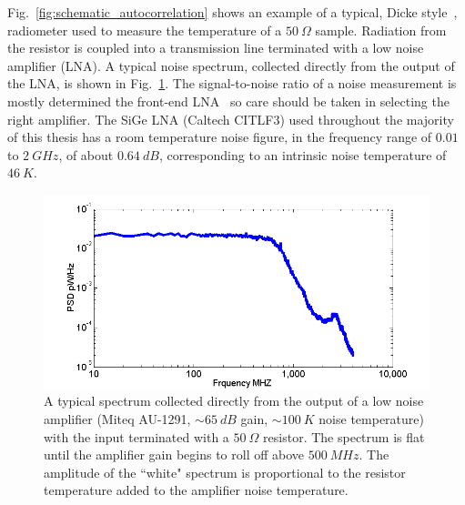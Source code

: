 Fig.~\ref{fig:schematic_autocorrelation} shows an example of a typical, Dicke style~\cite{dicke_measurement_1946}, radiometer used to measure the temperature of a $50~\Omega$ sample. Radiation from the resistor is coupled into a transmission line terminated with a low noise amplifier (LNA). A typical noise spectrum, collected directly from the output of the LNA, is shown in Fig.~\ref{fig:Miteq_spec}. The signal-to-noise ratio of a noise measurement is mostly determined the front-end LNA~\cite{pozar_microwave_2011} so care should be taken in selecting the right amplifier. The SiGe LNA (Caltech CITLF3) used throughout the majority of this thesis has a room temperature noise figure, in the frequency range of $0.01$ to $2~GHz$, of about $0.64~dB$, corresponding to an intrinsic noise temperature of $46~K$.
\begin{figure}
\includegraphics[width=\textwidth]{figures/Johnson_noise_thermometry/Miteq_spec.png}
\caption{A typical spectrum collected directly from the output of a low noise amplifier (Miteq AU-1291, ${\sim}65~dB$ gain, ${\sim}100~K$ noise temperature) with the input terminated with a $50~\Omega$ resistor. The spectrum is flat until the amplifier gain begins to roll off above $500~MHz$. The amplitude of the ``white" spectrum is proportional to the resistor temperature added to the amplifier noise temperature.}
\label{fig:Miteq_spec}
\end{figure}

